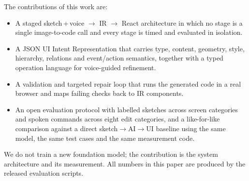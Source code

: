 The contributions of this work are:
\begin{itemize}
\item A staged sketch\,+\,voice $\rightarrow$ IR $\rightarrow$ React architecture in which no stage is a single image-to-code call and every stage is timed and evaluated in isolation.
\item A JSON UI Intent Representation that carries type, content, geometry, style, hierarchy, relations and event/action semantics, together with a typed operation language for voice-guided refinement.
\item A validation and targeted repair loop that runs the generated code in a real browser and maps failing checks back to IR components.
\item An open evaluation protocol with \CountSketches{} labelled sketches across \CountCategories{} screen categories and \CountCommands{} spoken commands across eight edit categories, and a like-for-like comparison against a direct sketch$\rightarrow$AI$\rightarrow$UI baseline using the same model, the same test cases and the same measurement code.
\end{itemize}
We do not train a new foundation model; the contribution is the system architecture and its measurement. All numbers in this paper are produced by the released evaluation scripts.
